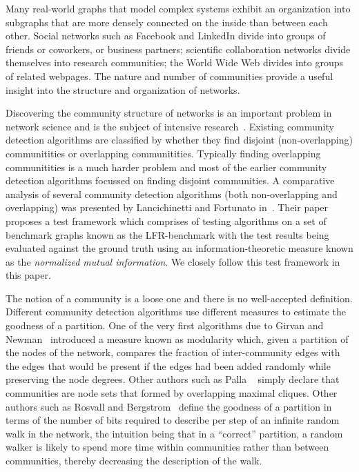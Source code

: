 Many real-world graphs that model complex systems exhibit an organization 
into subgraphs that are more densely connected on the inside than between each other. 
Social networks such as Facebook and LinkedIn divide into groups of friends 
or coworkers, or business partners; scientific collaboration networks divide 
themselves into research communities; the World Wide Web divides into groups 
of related webpages. The nature and number of communities provide 
a useful insight into the structure and organization of networks. 

Discovering the community structure of networks is an 
important problem in network science and is the subject 
of intensive research~\cite{GN02, GN04, CNM04, RCC04, DM04, PDFV05, NL07, 
BGLL08, RB08, RN09}. Existing community detection algorithms are 
classified by whether they find disjoint (non-overlapping) 
communitities or overlapping communitities. Typically finding 
overlapping communitities is a much harder problem and most of the 
earlier community detection algorithms focussed on finding disjoint 
communities. A comparative analysis of several community detection algorithms 
(both non-overlapping and overlapping) was presented by Lancichinetti and Fortunato 
in~\cite{LF09}. Their paper proposes a test framework 
which comprises of testing algorithms on a set of benchmark graphs 
known as the LFR-benchmark with the test results being evaluated against 
the ground truth using an information-theoretic measure known as the \emph{normalized 
mutual information}. We closely follow this test framework in this paper. 


The notion of a community is a loose one and there is no well-accepted definition.
Different community detection algorithms use different measures to estimate 
the goodness of a partition. One of the very first algorithms due to 
Girvan and Newman~\cite{GN02} introduced a measure known as modularity 
which, given a partition of the nodes of the network, compares the fraction of 
inter-community edges with the edges that would be present if the edges had been 
added randomly while preserving the node degrees. Other authors such as Palla 
\etal~\cite{PDFV05} simply declare that communities are node sets that formed 
by overlapping maximal cliques. Other authors such as Rosvall and Bergstrom~\cite{RB08} 
define the goodness of a partition in terms of the number of bits required to 
describe per step of an infinite random walk in the network, the intuition being 
that in a ``correct'' partition, a random walker is likely to spend more time 
within communities rather than between communities, thereby decreasing the 
description of the walk. 

